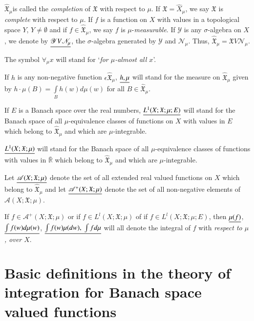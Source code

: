 $\hat{\mathfrak{X}}_\mu$\pageoriginale is called the
\textit{completion} of $\mathfrak{X}$  with respect to $\mu$. If
$\mathfrak{X} = \hat{X}_\mu$, we say $\mathfrak{X}$ is
\textit{complete} with respect to $\mu$. If $f$ is a function on $X$
with values in a topological space $Y$, $Y \neq \emptyset$ and if $f
\in\hat{\mathfrak{X}}_\mu$, we say $f$ is
$\mu$-\textit{measurable}. If $\mathscr{Y}$ is any $\sigma$-algebra on
$X$, we denote by $\underline{\mathscr{Y} V \mathscr{N}_\mu}$, the
$\sigma$-algebra generated by $\mathscr{Y}$ and
$\mathscr{N}_\mu$. Thus, $\hat{\mathfrak{X}}_\mu = \mathfrak{X} V
\mathscr{N}_\mu$. 

The symbol $\forall_\mu x$ will stand for `\textit{for $\mu$-almost
  all $x$}'. 

If $h$ is any non-negative function $\epsilon\hat{\mathfrak{X}}_\mu$,
$\underline{h,\mu}$ will  stand for the measure on $\hat{\mathfrak{X}}_\mu$
given by $h \cdot \mu (B) = \int\limits_B h(w) d\mu (w)$ for all $B
\in \hat{\mathfrak{X}}_\mu$.


If $E$ is a Banach space over the real numbers, $\underline{L^1 (X;
  \mathfrak{X} ; \mu ; E)}$ will stand for the Banach space of all
$\mu$-equivalence classes of functions on $X$ with values in $E$ which
belong to $\hat{\mathfrak{X}}_\mu$ and which are $\mu$-integrable. 

$\underline{L^1(X; \mathfrak{X}; \mu)}$ will stand for the Banach space of all $\mu$-equivalence classes of functions with values in $\bar{\mathbb{R}}$ which belong to $\hat{\mathfrak{X}}_\mu$ and which are $\mu$-integrable.

Let $\underline{\mathscr{A}(X; \mathfrak{X}; \mu)}$ denote the set of all extended real
valued functions on $X$ which belong to $\hat{\mathfrak{X}}_\mu$ and
let $\underline{\mathscr{A}^+ (X; \mathfrak{X} ;\mu)}$ denote the set of all
non-negative elements of $\mathscr{A} (X; \mathfrak{X}; \mu)$. 

If $f \in \mathscr{A}^+ (X; \mathfrak{X}; \mu)$  or if $f \in L^l(X;
\mathfrak{X}; \mu)$ of if $f \in L^l(X; \mathfrak{X}; \mu; E)$, then
$\underline{\mu(f)}$, $\underline{\int f(w) d \mu (w)}$, $\underline{\int f (w) \mu (dw), \;
  \int f d\mu}$ will all denote the integral of $f$ with
\textit{respect to $\mu$, over $X$}. 


\section[Basic definitions in the theory of...]{Basic definitions in
  the theory of integration for 
  Banach space valued functions}\label{part1:chap1:sec2}

